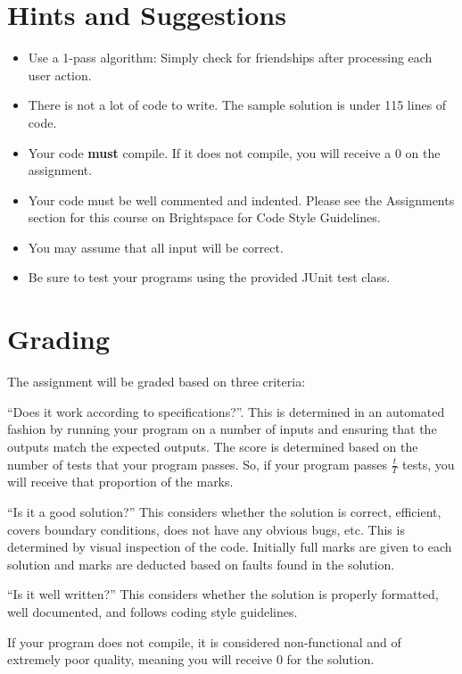 \documentclass[12pt,pdftex]{article}
\begin{document}
\section*{Hints and Suggestions}
\begin{itemize}\NoItemSpace
\item Use a 1-pass algorithm:  Simply check for 
      friendships after processing each user action.
\item There is not a lot of code to write.  The sample solution is under 
      115 lines of code.
\item Your code {\bf must} compile.  If it does not compile, you will
      receive a $0$ on the assignment.
\item Your code must be well commented and indented.  Please see the
      Assignments section for this course on Brightspace for Code 
      Style Guidelines.
\item You may assume that all input will be correct.  
\item Be sure to test your programs using the provided JUnit test class. 
\end{itemize}


\section*{Grading}
The assignment will be graded based on three criteria: 
\begin{description}\NoItemSpace
\item[Functionality] ``Does it work according to specifications?''.  
   This is determined in an automated fashion by running your program on 
   a number of inputs and ensuring that the outputs match the expected 
   outputs.  The score is determined based on the number of tests that
   your program passes.  So, if your program passes $\frac{t}{T}$ tests,
   you will receive that proportion of the marks.

\item[Quality of Solution] ``Is it a good solution?''  This considers
   whether the solution is correct, efficient, covers boundary conditions,
   does not have any obvious bugs, etc.  This is determined by visual
   inspection of the code.  Initially full marks are given to each solution
   and marks are deducted based on faults found in the solution.

\item[Code Clarity] ``Is it well written?''  This considers whether the
   solution is properly formatted, well documented, and follows 
   coding style guidelines.  
\end{description}
If your program does not compile, it is considered non-functional and of
extremely poor quality, meaning you will receive $0$ for the solution.
\end{document}
